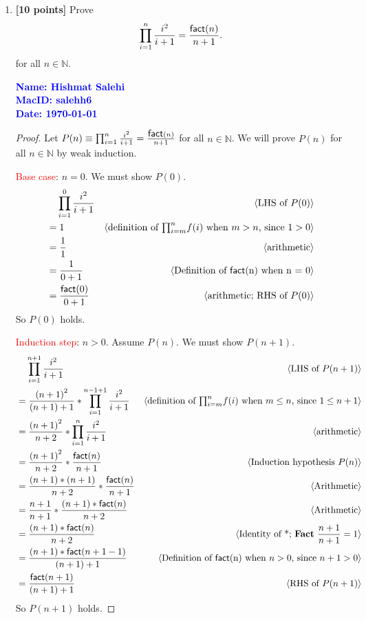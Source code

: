 \documentclass[11pt,fleqn]{article}
\newcommand{\mname}[1]{\mbox{\sf #1}}
\newcommand{\pnote}[1]{{\langle \text{#1} \rangle}}
\begin{document}
\begin{enumerate}

  \item \textbf{[10 points]} Prove \[\prod_{i = 1}^{n} \frac{i^2}{i +
    1} = \frac{\mname{fact}(n)}{n + 1}.\] for all $n \in \mathbb{N}$.

  \bigskip

  \textcolor{blue}{\textbf{Name: Hishmat Salehi \\ MacID: salehh6 \\ Date: \today}}

\begin{proof}
Let $P(n) \equiv \prod_{i = 1}^{n} \frac{i^2}{i +
    1} = \frac{\mname{fact}(n)}{n + 1}$ for all $n \in \mathbb{N}$.  We will prove $P(n)$
for all $n \in \mathbb{N}$ by weak induction.

\medskip

\textcolor{red}{Base case}: $n = 0$.  We must show $P(0)$.
\begin{align*}
  &\phantom{{}=} \prod_{i = 1}^{0} \frac{i^2}{i + 1} & \pnote{LHS of $P(0)$}\\
  &= 1          & \pnote{definition of $\textstyle{\prod}_{i=m}^{n} f(i)$ when $m > n$, since $1 > 0$}\\
  &= \frac{1}{1}  & \pnote{arithmetic}\\
  &= \frac{1}{0 + 1}      & \pnote{Definition of \mname{fact}(n) when n = 0}\\
  &= \frac{\mname{fact}(0)}{0 + 1}    & \pnote{arithmetic; RHS of $P(0)$}
\end{align*}
So $P(0)$ holds.

\medskip

\textcolor{red}{Induction step}: $n > 0$. Assume $P(n)$. We must show $P(n + 1)$.
\begin{align*}
  &\phantom{{}=} \prod_{i = 1}^{n+1} \frac{i^2}{i + 1}   & \pnote{LHS of $P(n + 1)$}\\
  &= \frac{{(n+1)}^2}{(n+1)+1}* \prod_{i = 1}^{n-1+1} \frac{i^2}{i + 1}  & \pnote{definition of $\textstyle{\prod}_{i=m}^{n} f(i)$ when $m \le n$, since $1 \le n+1$}\\
  &= \frac{{(n+1)}^2}{n+2}* \prod_{i = 1}^{n} \frac{i^2}{i + 1}  & \pnote{arithmetic}\\
  &= \frac{{(n+1)}^2}{n+2}* \frac{\mname{fact}(n)}{n + 1}  & \pnote{Induction hypothesis $P(n)$}\\
  &= \frac{(n+1)*(n+1)}{n+2}* \frac{\mname{fact}(n)}{n + 1}  & \pnote{Arithmetic}\\
  &= \frac{n+1}{n+1}* \frac{(n+1)*\mname{fact}(n)}{n + 2}  & \pnote{Arithmetic}\\
  &= \frac{(n+1)*\mname{fact}(n)}{n + 2}  & \pnote{Identity of *; \textbf{Fact} $\frac{n+1}{n+1} = 1$}\\
  &= \frac{(n+1)*\mname{fact}(n+1-1)}{(n+1)+1}  & \pnote{Definition of \mname{fact}(n) when $n > 0$, since $n + 1 > 0$}\\
  &= \frac{\mname{fact}(n+1)}{(n+1)+1}  & \pnote{RHS of $P(n + 1)$}\\
\end{align*}
So $P(n + 1)$ holds.


\end{proof}
\end{enumerate}
\end{document}

